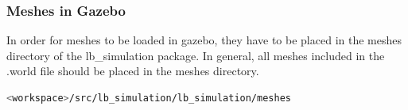 \documentclass[11pt]{article}
\begin{document}
\subsubsection{Meshes in Gazebo}
In order for meshes to be loaded in gazebo, they have to be placed in the meshes directory
of the lb\_simulation package. In general, all meshes included in the .world file should be placed in the meshes directory.
\begin{lstlisting}[language=bash]
<workspace>/src/lb_simulation/lb_simulation/meshes
\end{lstlisting}
\end{document}
